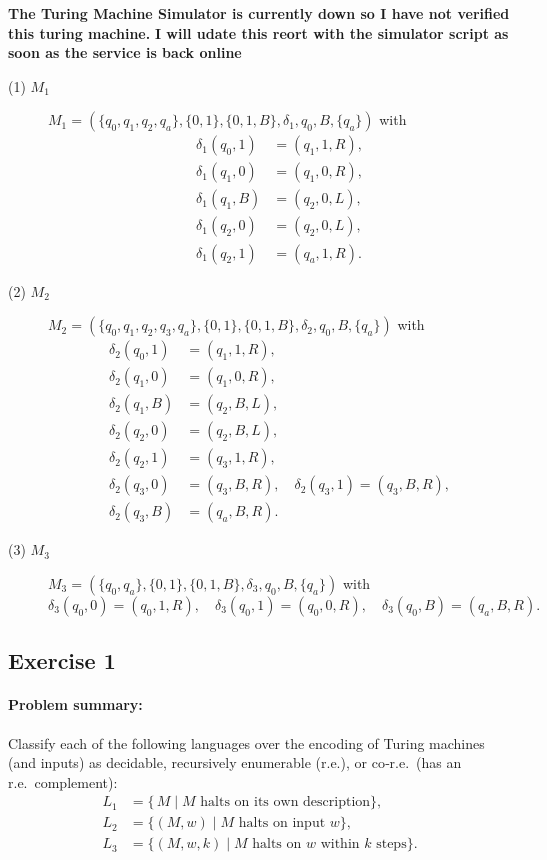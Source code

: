 \documentclass{article}
\begin{document}
\textbf{The Turing Machine Simulator is currently down so I have not verified this turing machine.}
\textbf{I will udate this reort with the simulator script as soon as the service is back online}

\begin{description}
  \item[(1) \(M_1\)]  
  \(M_1=(\{q_0,q_1,q_2,q_a\},\{0,1\},\{0,1,B\},\delta_1,q_0,B,\{q_a\})\) with
  \[
    \begin{aligned}
      \delta_1(q_0,1)&=(q_1,1,R),\\
      \delta_1(q_1,0)&=(q_1,0,R),\\
      \delta_1(q_1,B)&=(q_2,0,L),\\
      \delta_1(q_2,0)&=(q_2,0,L),\\
      \delta_1(q_2,1)&=(q_a,1,R).
    \end{aligned}
    \]
    
    \item[(2) \(M_2\)]  
    \(M_2=(\{q_0,q_1,q_2,q_3,q_a\},\{0,1\},\{0,1,B\},\delta_2,q_0,B,\{q_a\})\) with
    \[
      \begin{aligned}
        \delta_2(q_0,1)&=(q_1,1,R),\\
        \delta_2(q_1,0)&=(q_1,0,R),\\
        \delta_2(q_1,B)&=(q_2,B,L),\\
        \delta_2(q_2,0)&=(q_2,B,L),\\
        \delta_2(q_2,1)&=(q_3,1,R),\\
        \delta_2(q_3,0)&=(q_3,B,R),\quad
        \delta_2(q_3,1)=(q_3,B,R),\\
        \delta_2(q_3,B)&=(q_a,B,R).
      \end{aligned}
      \]
      
      \item[(3) \(M_3\)]  
      \(M_3=(\{q_0,q_a\},\{0,1\},\{0,1,B\},\delta_3,q_0,B,\{q_a\})\) with
      \[
        \delta_3(q_0,0)=(q_0,1,R),\quad
        \delta_3(q_0,1)=(q_0,0,R),\quad
        \delta_3(q_0,B)=(q_a,B,R).
        \]
      \end{description}
      
      
      \subsection*{Exercise 1}
      \paragraph{Problem summary:}  
      Classify each of the following languages over the encoding of Turing machines (and inputs) as decidable, recursively enumerable (r.e.), or co‑r.e.\ (has an r.e.\ complement):
      \[
        \begin{aligned}
          L_1 &= \{\,M \mid M\text{ halts on its own description}\},\\
          L_2 &= \{(M,w)\mid M\text{ halts on input }w\},\\
          L_3 &= \{(M,w,k)\mid M\text{ halts on }w\text{ within }k\text{ steps}\}.
        \end{aligned}
        \]
        
\end{document}
